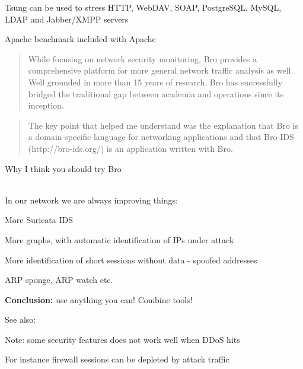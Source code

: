 \documentclass[20pt,landscape,a4paper,footrule]{foils}
\begin{document}
\begin{list1}
\item Tsung can be used to stress HTTP, WebDAV, SOAP, PostgreSQL, MySQL, LDAP and Jabber/XMPP servers 
\item Apache benchmark included with Apache
\end{list1}



\centerline{}




\begin{quote}
While focusing on network security monitoring, Bro provides a comprehensive platform for more general network traffic analysis as well. Well grounded in more than 15 years of research, Bro has successfully bridged the traditional gap between academia and operations since its inception.
\end{quote}



\begin{quote}
	The key point that helped me understand was the explanation that Bro is a
               domain-specific language for networking applications and that Bro-IDS
               (http://bro-ids.org/) is an application written with Bro.
\end{quote}

Why I think you should try Bro\\
\\



In our network we are always improving things:
\begin{list1}
\item More Suricata IDS 
\item More graphs, with automatic identification of IPs under attack
\item More identification of short sessions without data - spoofed addresses
\item ARP sponge, ARP watch etc.
\end{list1}


\begin{list1}
\item {\bf Conclusion:} use anything you can! Combine tools!
\end{list1}

See also:\\





Note: some security features does not work well when DDoS hits

For instance firewall sessions can be depleted by attack traffic


\myquestionspage

\hlkprofiluk
\end{document}
